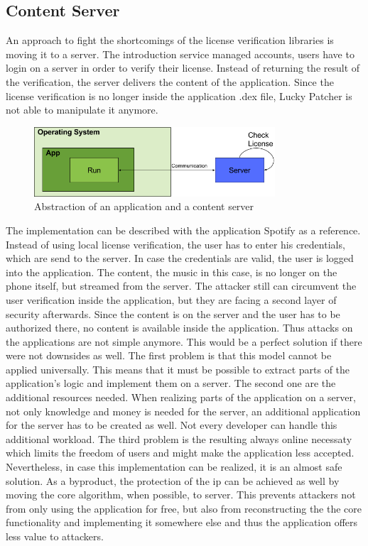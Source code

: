 \subsection{Content Server} \label{section:counter-replace-server}
An approach to fight the shortcomings of the license verification libraries is moving it to a server.
The introduction service managed accounts, users have to login on a server in order to verify their license.
Instead of returning the result of the verification, the server delivers the content of the application.
Since the license verification is no longer inside the application \gls{.dex} file, Lucky Patcher is not able to manipulate it anymore.
\newline
\begin{figure}[h]
    \centering
    \includegraphics[width=0.8\textwidth]{data/contentServer.png}
    \caption{Abstraction of an application and a content server}
    \label{fig:contentServer}
\end{figure}
The implementation can be described with the application Spotify \cite{spotify} as a reference.
Instead of using local license verification, the user has to enter his credentials, which are send to the server.
In case the credentials are valid, the user is logged into the application.
The content, the music in this case, is no longer on the phone itself, but streamed from the server.
The attacker still can circumvent the user verification inside the application, but they are facing a second layer of security afterwards.
Since the content is on the server and the user has to be authorized there, no content is available inside the application.
Thus attacks on the applications are not simple anymore.
\newline
This would be a perfect solution if there were not downsides as well.
The first problem is that this model cannot be applied universally.
This means that it must be possible to extract parts of the application's logic and implement them on a server.
The second one are the additional resources needed.
When realizing parts of the application on a server, not only knowledge and money is needed for the server, an additional application for the server has to be created as well.
Not every developer can handle this additional workload.
The third problem is the resulting always online necessaty which limits the freedom of users and might make the application less accepted.
\newline
Nevertheless, in case this implementation can be realized, it is an almost safe solution.
As a byproduct, the protection of the \gls{ip} can be achieved as well by moving the core algorithm, when possible, to server.
This prevents attackers not from only using the application for free, but also from reconstructing the the core functionality and implementing it somewhere else and thus the application offers less value to attackers.
